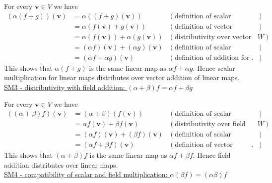 \noindent For every $\mathbf{v}\in V$ we have
\begin{align*}
(\alpha(f+g)) (\mathbf{v}) &= \alpha((f+g) (\mathbf{v}))  &  (\text{definition of scalar multiplication for linear maps}) \\
%
&=  \alpha(f(\mathbf{v})+g(\mathbf{v})) &  (\text{definition of vector addition for linear maps}) \\
%
&=  \alpha \left(f(\mathbf{v})\right) +\alpha \left( g(\mathbf{v})\right)  &  (\text{distributivity over vector addition in $W$})\\
%
&=  \left(\alpha f\right)(\mathbf{v}) +\left(\alpha  g\right)(\mathbf{v})  &  (\text{definition of scalar multiplication for linear maps})\\
%
&=  \left(\alpha f + \alpha  g\right)(\mathbf{v})  &  (\text{definition of addition  for linear maps}).
\end{align*}
This shows that $\alpha(f+g)$ is the same linear map as $\alpha f+\alpha g$. Hence scalar multiplication for linear maps distributes over vector addition of linear maps. \\


\noindent \underline{SM3 - distributivity with field addition: $(\alpha+\beta)f=\alpha f+\beta g$}

\noindent For every $\mathbf{v}\in V$ we have
\begin{align*}
\left( (\alpha+\beta)f \right)(\mathbf{v}) &= (\alpha+\beta)\left( f(\mathbf{v}) \right) 
 & (\text{definition of scalar multiplication for linear maps}) \\
%
 &= \alpha  f(\mathbf{v}) +\beta  f(\mathbf{v})
 & (\text{distributivity over field addition for $W$}) \\
%
 &= \left(\alpha f\right)(\mathbf{v}) + \left(\beta f\right) (\mathbf{v})
 & (\text{definition of scalar multiplication for linear maps}) \\
%
 &= \left(\alpha f + \beta f\right) (\mathbf{v})
 & (\text{definition of vector addition for linear maps}).
\end{align*}
This shows that $(\alpha+\beta)f$ is the same linear map as $\alpha f + \beta f$. Hence field addition distributes over linear maps. 
\\


\noindent \underline{SM4 - compatibility of scalar and field multiplication: $\alpha(\beta f)=(\alpha\beta) f$}


